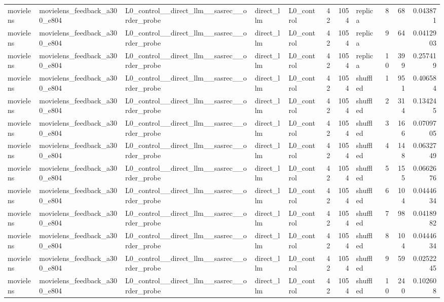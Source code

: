 \begin{table}[htbp!]
\begin{tabular}{lllllrrlrrr}
movielens & movielens\_feedback\_a300\_e804 & L0\_control\_\_direct\_llm\_\_sasrec\_\_order\_probe & direct\_llm & L0\_control & 42 & 1054 & replica & 8 & 68 & 0.043871 \\
movielens & movielens\_feedback\_a300\_e804 & L0\_control\_\_direct\_llm\_\_sasrec\_\_order\_probe & direct\_llm & L0\_control & 42 & 1054 & replica & 9 & 64 & 0.0412903 \\
movielens & movielens\_feedback\_a300\_e804 & L0\_control\_\_direct\_llm\_\_sasrec\_\_order\_probe & direct\_llm & L0\_control & 42 & 1054 & replica & 10 & 399 & 0.257419 \\
movielens & movielens\_feedback\_a300\_e804 & L0\_control\_\_direct\_llm\_\_sasrec\_\_order\_probe & direct\_llm & L0\_control & 42 & 1054 & shuffled & 1 & 951 & 0.406584 \\
movielens & movielens\_feedback\_a300\_e804 & L0\_control\_\_direct\_llm\_\_sasrec\_\_order\_probe & direct\_llm & L0\_control & 42 & 1054 & shuffled & 2 & 314 & 0.134245 \\
movielens & movielens\_feedback\_a300\_e804 & L0\_control\_\_direct\_llm\_\_sasrec\_\_order\_probe & direct\_llm & L0\_control & 42 & 1054 & shuffled & 3 & 166 & 0.0709705 \\
movielens & movielens\_feedback\_a300\_e804 & L0\_control\_\_direct\_llm\_\_sasrec\_\_order\_probe & direct\_llm & L0\_control & 42 & 1054 & shuffled & 4 & 148 & 0.0632749 \\
movielens & movielens\_feedback\_a300\_e804 & L0\_control\_\_direct\_llm\_\_sasrec\_\_order\_probe & direct\_llm & L0\_control & 42 & 1054 & shuffled & 5 & 155 & 0.0662676 \\
movielens & movielens\_feedback\_a300\_e804 & L0\_control\_\_direct\_llm\_\_sasrec\_\_order\_probe & direct\_llm & L0\_control & 42 & 1054 & shuffled & 6 & 104 & 0.0444634 \\
movielens & movielens\_feedback\_a300\_e804 & L0\_control\_\_direct\_llm\_\_sasrec\_\_order\_probe & direct\_llm & L0\_control & 42 & 1054 & shuffled & 7 & 98 & 0.0418982 \\
movielens & movielens\_feedback\_a300\_e804 & L0\_control\_\_direct\_llm\_\_sasrec\_\_order\_probe & direct\_llm & L0\_control & 42 & 1054 & shuffled & 8 & 104 & 0.0444634 \\
movielens & movielens\_feedback\_a300\_e804 & L0\_control\_\_direct\_llm\_\_sasrec\_\_order\_probe & direct\_llm & L0\_control & 42 & 1054 & shuffled & 9 & 59 & 0.0252245 \\
movielens & movielens\_feedback\_a300\_e804 & L0\_control\_\_direct\_llm\_\_sasrec\_\_order\_probe & direct\_llm & L0\_control & 42 & 1054 & shuffled & 10 & 240 & 0.102608 \\

\end{tabular}
\end{table}
